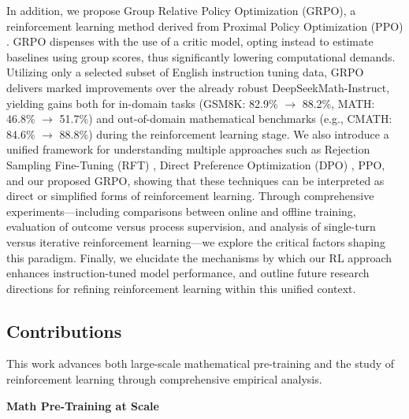 In addition, we propose Group Relative Policy Optimization (GRPO), a reinforcement learning method derived from Proximal Policy Optimization (PPO) \citep{schulman2017proximal}. GRPO dispenses with the use of a critic model, opting instead to estimate baselines using group scores, thus significantly lowering computational demands. Utilizing only a selected subset of English instruction tuning data, GRPO delivers marked improvements over the already robust DeepSeekMath-Instruct, yielding gains both for in-domain tasks (GSM8K: 82.9\% $\rightarrow$ 88.2\%, MATH: 46.8\% $\rightarrow$ 51.7\%) and out-of-domain mathematical benchmarks (e.g., CMATH: 84.6\% $\rightarrow$ 88.8\%) during the reinforcement learning stage. We also introduce a unified framework for understanding multiple approaches such as Rejection Sampling Fine-Tuning (RFT) \citep{yuan2023scaling}, Direct Preference Optimization (DPO) \citep{dpo}, PPO, and our proposed GRPO, showing that these techniques can be interpreted as direct or simplified forms of reinforcement learning. Through comprehensive experiments—including comparisons between online and offline training, evaluation of outcome versus process supervision, and analysis of single-turn versus iterative reinforcement learning—we explore the critical factors shaping this paradigm. Finally, we elucidate the mechanisms by which our RL approach enhances instruction-tuned model performance, and outline future research directions for refining reinforcement learning within this unified context.

\subsection{Contributions}
This work advances both large-scale mathematical pre-training and the study of reinforcement learning through comprehensive empirical analysis.

\textbf{Math Pre-Training at Scale}


